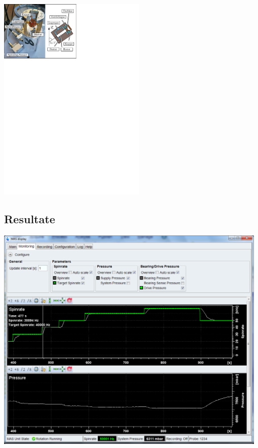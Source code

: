 \documentclass[a4paper]{article}
\newenvironment{Figure}
	{\par\medskip\noindent\minipage{\linewidth}}
	{\endminipage\par\medskip}
\begin{document}
\begin{multicols*}{2}
				\begin{Figure}
					\centering
					\includegraphics[trim={0cm 21.2cm 9.7cm 0},clip,width=7cm]{images/Device_3.pdf}
					\label{fig:device3}
				\end{Figure}
			
	\end{multicols*}


	\subsection{Resultate}
	
	\begin{Figure}
		\centering
		\includegraphics[width=13cm]{images/gruppe1_auf.png}
		\label{fig:topspin_up}
	\end{Figure}
	
\end{document}
